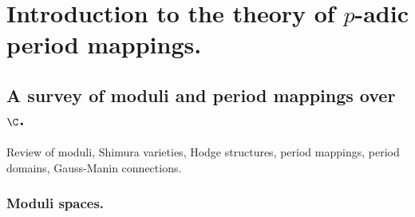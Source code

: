 \chapter{Introduction to the theory of $p$-adic period mappings.}
\label{chap:period-mappings}
\minitoc
\newpage
\section{A survey of moduli and period mappings over $\C$.}\label{sec:1}

\begin{abst}
Review of moduli, Shimura varieties, 
Hodge structures, period mappings, period domains, Gauss-Manin connections.
\end{abst}
   
\subsection{Moduli spaces.}\label{sub:1.1}

